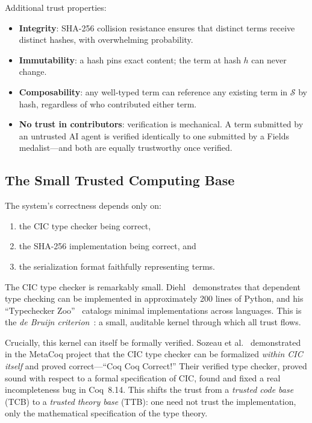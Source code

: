 \documentclass[11pt]{article}
\theoremstyle{definition}
\theoremstyle{plain}
\theoremstyle{remark}
\newcommand{\hashset}{\mathcal{S}}
\begin{document}
Additional trust properties:
\begin{itemize}[nosep]
  \item \textbf{Integrity}: SHA-256 collision resistance ensures that distinct terms receive
    distinct hashes, with overwhelming probability.
  \item \textbf{Immutability}: a hash pins exact content; the term at hash $h$ can never change.
  \item \textbf{Composability}: any well-typed term can reference any existing term in $\hashset$ by hash,
    regardless of who contributed either term.
  \item \textbf{No trust in contributors}: verification is mechanical.
    A term submitted by an untrusted AI agent is verified identically to one submitted by a
    Fields medalist---and both are equally trustworthy once verified.
\end{itemize}

\subsection{The Small Trusted Computing Base}
\label{sec:tcb}

The system's correctness depends only on:
\begin{enumerate}[nosep]
  \item the CIC type checker being correct,
  \item the SHA-256 implementation being correct, and
  \item the serialization format faithfully representing terms.
\end{enumerate}

The CIC type checker is remarkably small.
Diehl~\cite{diehl200lines} demonstrates that dependent type checking can be implemented in
approximately 200 lines of Python, and his ``Typechecker Zoo''~\cite{diehlzoo} catalogs
minimal implementations across languages.
This is the \emph{de Bruijn criterion}~\cite{debruijn1970}: a small, auditable kernel through
which all trust flows.

Crucially, this kernel can itself be formally verified.
Sozeau et al.~\cite{metacoq} demonstrated in the MetaCoq project that the CIC type checker
can be formalized \emph{within CIC itself} and proved correct---``Coq Coq Correct!''
Their verified type checker, proved sound with respect to a formal specification of CIC,
found and fixed a real incompleteness bug in Coq~8.14.
This shifts the trust from a \emph{trusted code base} (TCB) to a \emph{trusted theory base} (TTB):
one need not trust the implementation, only the mathematical specification of the type theory.
\end{document}
